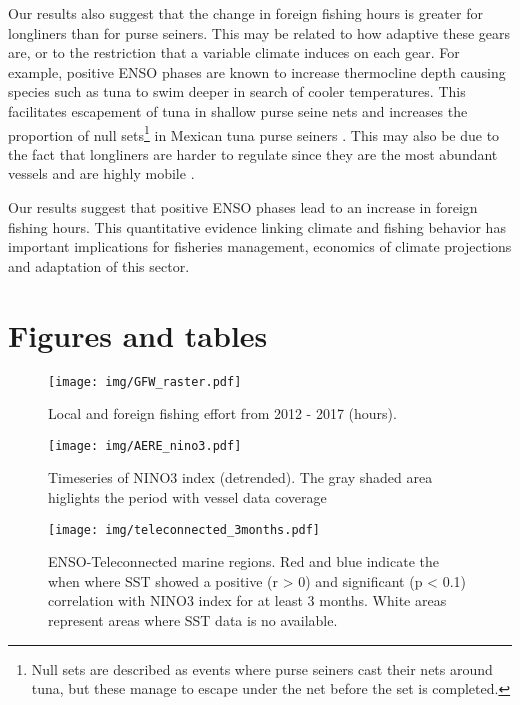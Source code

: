 \documentclass[]{article}
\let\rmarkdownfootnote\footnote%
\def\footnote{\protect\rmarkdownfootnote}
\begin{document}
Our results also suggest that the change in foreign fishing hours is greater for longliners than for purse seiners. This may be related to how adaptive these gears are, or to the restriction that a variable climate induces on each gear. For example, positive ENSO phases are known to increase thermocline depth causing species such as tuna to swim deeper in search of cooler temperatures. This facilitates escapement of tuna in shallow purse seine nets and increases the proportion of null sets\footnote{Null sets are described as events where purse seiners cast their nets around tuna, but these manage to escape under the net before the set is completed.} in Mexican tuna purse seiners \citep{dreyfusleon_2015}. This may also be due to the fact that longliners are harder to regulate since they are the most abundant vessels and are highly mobile \citep{sala_2018,ortuocrespo_2018}.

Our results suggest that positive ENSO phases lead to an increase in foreign fishing hours. This quantitative evidence linking climate and fishing behavior has important implications for fisheries management, economics of climate projections and adaptation of this sector.

\clearpage

\hypertarget{figures-and-tables}{%
\section{Figures and tables}\label{figures-and-tables}}

\begin{figure}
\centering
\texttt{[image: img/GFW\_raster.pdf]}
\caption{\label{fig:gfw} Local and foreign fishing effort from 2012 - 2017 (hours).}
\end{figure}

\begin{figure}
\centering
\texttt{[image: img/AERE\_nino3.pdf]}
\caption{Timeseries of NINO3 index (detrended). The gray shaded area  higlights the period with vessel data coverage}
\end{figure}

\begin{figure}
\centering
\texttt{[image: img/teleconnected\_3months.pdf]}
\caption{\label{fig:teleconnections} ENSO-Teleconnected marine regions.
Red and blue indicate the when where SST showed a positive (r
\textgreater{} 0) and significant (p \textless{} 0.1) correlation with
NINO3 index for at least 3 months. White areas represent areas where SST
data is no available.}
\end{figure}

\clearpage



\clearpage

\renewcommand\refname{References}

\end{document}
